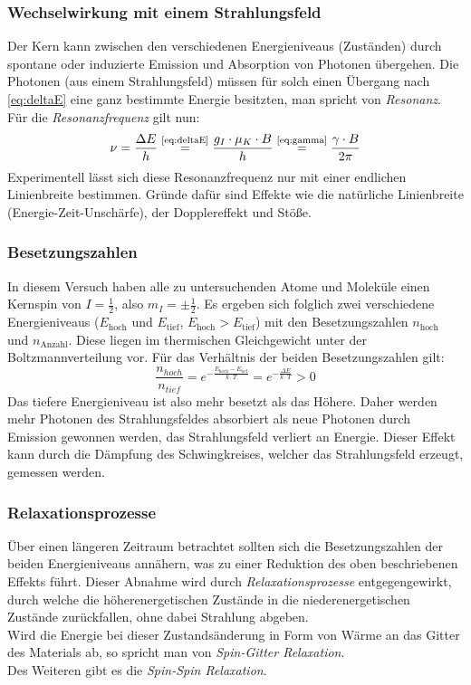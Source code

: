 \subsubsection{Wechselwirkung mit einem Strahlungsfeld}
Der Kern kann zwischen den verschiedenen Energieniveaus (Zuständen) durch spontane oder induzierte Emission und Absorption von Photonen übergehen. 
Die Photonen (aus einem Strahlungsfeld) müssen für solch einen Übergang nach \autoref{eq:deltaE} eine ganz bestimmte Energie besitzten, man spricht 
von \emph{Resonanz}. Für die \emph{Resonanzfrequenz} gilt nun:
\begin{equation}
  \label{eq:nu}
  \nu = \frac{\Delta E}{h} \refeq{eq:deltaE} \frac{g_I \cdot \mu_K \cdot B}{h} \refeq{eq:gamma} \frac{\gamma \cdot B}{2 \pi}
\end{equation}
Experimentell lässt sich diese Resonanzfrequenz nur mit einer endlichen Linienbreite bestimmen. Gründe dafür sind Effekte wie die natürliche 
Linienbreite (Energie-Zeit-Unschärfe), der Dopplereffekt und Stöße.

\subsubsection{Besetzungszahlen}
In diesem Versuch haben alle zu untersuchenden Atome und Moleküle einen Kernspin von $I=\frac{1}{2}$, also $m_I = \pm \frac{1}{2}$. Es ergeben sich 
folglich zwei verschiedene Energieniveaus ($E_{\text{hoch}}$ und $E_{\text{tief}}$, $E_{\text{hoch}} > E_{\text{tief}}$) mit den 
Besetzungszahlen $n_{\text{hoch}}$ und $n_{\text{Anzahl}}$. 
Diese liegen im thermischen Gleichgewicht unter der Boltzmannverteilung vor. Für das Verhältnis der beiden Besetzungszahlen gilt:
\begin{equation}
  \frac{n_{hoch}}{n_{tief}} = e^{-\frac{E_\text{hoch} - E_\text{tief}}{k \cdot T}} = e^{- \frac{\Delta E}{k \cdot T}} > 0
\end{equation}
Das tiefere Energieniveau ist also mehr besetzt als das Höhere. Daher werden mehr Photonen des Strahlungsfeldes absorbiert als neue Photonen durch 
Emission gewonnen werden, das Strahlungsfeld verliert an Energie. Dieser Effekt kann durch die Dämpfung des Schwingkreises, welcher das 
Strahlungsfeld erzeugt, gemessen werden.

\subsubsection{Relaxationsprozesse}
Über einen längeren Zeitraum betrachtet sollten sich die Besetzungszahlen der beiden Energieniveaus annähern, was zu einer Reduktion des oben 
beschriebenen Effekts führt. Dieser Abnahme wird durch \emph{Relaxationsprozesse} entgegengewirkt, durch welche die höherenergetischen Zustände 
in die niederenergetischen Zustände zurückfallen, ohne dabei Strahlung abgeben. \\
Wird die Energie bei dieser Zustandsänderung in Form von Wärme an das Gitter des Materials ab, so spricht man von \emph{Spin-Gitter Relaxation}. \\
Des Weiteren gibt es die \emph{Spin-Spin Relaxation}. %

